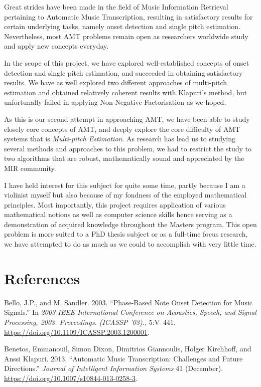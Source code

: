 \documentclass[american,]{article}
\begin{document}
Great strides have been made in the field of Music Information
Retrieval pertaining to Automatic Music Transcription,
resulting in satisfactory results for certain underlying
tasks, namely onset detection and single pitch estimation.
Nevertheless, most AMT problems remain open as researchers
worldwide study and apply new concepts everyday.

In the scope of this project, we have explored well-established concepts
of onset detection and single pitch estimation, and succeeded in obtaining
satisfactory results.
We have as well explored two different approaches of multi-pitch estimation
and obtained relatively coherent results with Klapuri's method,
but unfortunally failed in applying Non-Negative Factorisation
as we hoped.

As this is our second attempt in approaching AMT,
we have been able to study closely core concepts of AMT,
and deeply explore the core difficulty of AMT systems
that is \emph{Multi-pitch Estimation}.
As research has lead us to studying several methods and approaches
to this problem, we had to restrict the study to two algorithms
that are robust, mathematically sound and appreciated by the MIR community.

I have held interest for this subject for quite some time,
partly because I am a violinist myself but also because
of my fondness of the employed mathematical principles.
Most importantly, this project requires application of various
mathematical notions as well as computer science skills
hence serving as a demonstration of acquired knowledge
throughout the Masters program.
This open problem is more suited to a PhD thesis subject or
as a full-time focus research, we have attempted to do as much
as we could to accomplish with very little time.

\pagebreak

\hypertarget{references}{%
\section*{References}\label{references}}

\hypertarget{refs}{}
\leavevmode\hypertarget{ref-bello}{}%
Bello, J.P., and M. Sandler. 2003. ``Phase-Based Note Onset Detection for Music Signals.'' In \emph{2003 IEEE International Conference on Acoustics, Speech, and Signal Processing, 2003. Proceedings. (ICASSP '03).}, 5:V--441. \url{https://doi.org/10.1109/ICASSP.2003.1200001}.

\leavevmode\hypertarget{ref-benetos_2013}{}%
Benetos, Emmanouil, Simon Dixon, Dimitrios Giannoulis, Holger Kirchhoff, and Anssi Klapuri. 2013. ``Automatic Music Transcription: Challenges and Future Directions.'' \emph{Journal of Intelligent Information Systems} 41 (December). \url{https://doi.org/10.1007/s10844-013-0258-3}.
\end{document}

